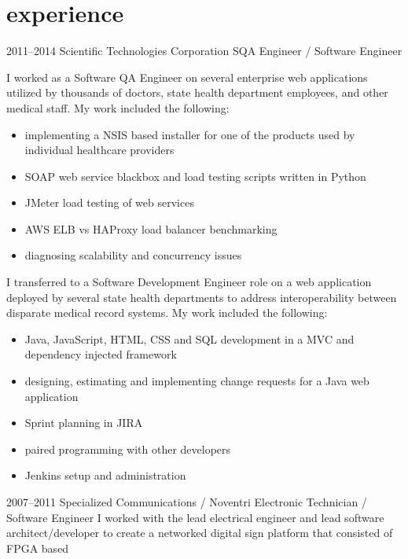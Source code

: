 \section{experience}

\begin{entrylist}
    \entry
        {2011--2014}
        {Scientific Technologies Corporation}
        {SQA Engineer / Software Engineer}
        {
            I worked as a Software QA Engineer on several enterprise web applications utilized by thousands of doctors, state health department employees, and other medical staff.
            My work included the following:
            \begin{itemize}
                \item implementing a NSIS based installer for one of the products used by individual healthcare providers
                \item SOAP web service blackbox and load testing scripts written in Python
                \item JMeter load testing of web services
                \item AWS ELB vs HAProxy load balancer benchmarking
                \item diagnosing scalability and concurrency issues
            \end{itemize}
            I transferred to a Software Development Engineer role on a web application deployed by several state health departments to address interoperability between disparate medical record systems.
            My work included the following:
            \begin{itemize}
                \item Java, JavaScript, HTML, CSS and SQL development in a MVC and dependency injected framework
                \item designing, estimating and implementing change requests for a Java web application
                \item Sprint planning in JIRA
                \item paired programming with other developers
                \item Jenkins setup and administration
            \end{itemize}
        }
    \entry
        {2007--2011}
        {Specialized Communications / Noventri}
        {Electronic Technician / Software Engineer}
        {
            I worked with the lead electrical engineer and lead software architect/developer to
            create a networked digital sign platform that consisted of FPGA based
}
\end{entrylist}
